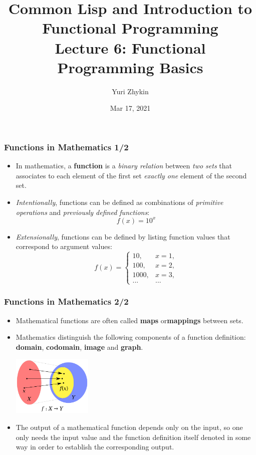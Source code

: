 \documentclass{beamer}
\title{
  Common Lisp and Introduction to Functional Programming \\
  Lecture 6: Functional Programming Basics
}
\author{Yuri Zhykin}
\date{Mar 17, 2021}
\begin{document}
\frame{\titlepage}

\begin{frame}[fragile]
  \frametitle{Functions in Mathematics 1/2}
  \begin{itemize}
  \item In mathematics, a \textbf{function} is a \textit{binary relation}
    between \textit{two sets} that associates to each element of the first set
    \textit{exactly one} element of the second set.
  \item \textit{Intentionally}, functions can be defined as combinations of
    \textit{primitive operations} and \textit{previously defined functions}:
    $$f(x) = 10^x$$
  \item \textit{Extensionally}, functions can be defined by listing function
    values that correspond to argument values:
    $$f(x)=
    \begin{cases}
      10, &x = 1,\\
      100, &x = 2,\\
      1000, &x = 3,\\
      ... &...
    \end{cases}
    $$
  \end{itemize}
\end{frame}

\begin{frame}[fragile]
  \frametitle{Functions in Mathematics 2/2}
  \begin{itemize}
  \item Mathematical functions are often called \textbf{maps}
    or\textbf{mappings} between sets.
  \item Mathematics distinguish the following components of a function
    definition: \textbf{domain}, \textbf{codomain}, \textbf{image} and
    \textbf{graph}.
    \begin{center}
      \includegraphics[width=0.3\textwidth]{xyg}
    \end{center}
  \item The output of a mathematical function depends only on the input, so one
    only needs the input value and the function definition itself denoted in
    some way in order to establish the corresponding output.
  \end{itemize}
\end{frame}
\end{document}
